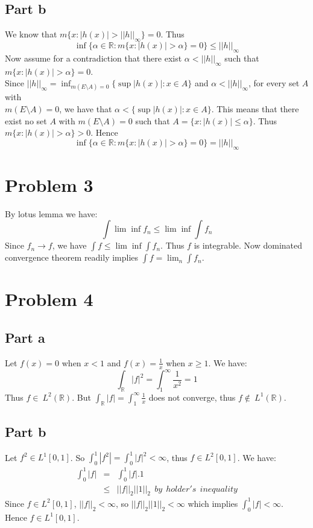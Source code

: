 \documentclass[12pt]{article}
\begin{document}
\subsection*{Part b}
We know that $m\{x : |h(x)| > ||h||_{\infty}\}=0$. Thus
$$\inf \{\alpha \in \mathbb{R}: m\{x:|h(x)| >\alpha \} =0\} \le ||h||_{\infty}$$
Now assume for a contradiction that there exist $\alpha < ||h||_{\infty}$ such that
$m\{x : |h(x)| > \alpha \} = 0$.\\
Since $||h||_{\infty}=\inf_{m(E\setminus A)=0}
\{\sup |h(x)|:x \in A\}$ and $\alpha < ||h||_{\infty}$, for every set $A$ with \\ 
$m(E\setminus A)=0$, we have that $\alpha < \{\sup |h(x)|: x \in A\}$.
This means that there exist no set $A$ with $m(E\setminus A)=0$ such that
$A=\{x: |h(x)| \le \alpha \}$. Thus $m\{x: |h(x)| > \alpha \} > 0$. Hence 
$$\inf \{\alpha \in \mathbb{R}: m\{x:|h(x)| >\alpha \} =0\} = ||h||_{\infty}$$


\section*{Problem 3}
By lotus lemma we have:
$$\int \lim \inf  f_n \le \lim \inf \int f_n$$
Since $f_n \rightarrow f$, we have 
$\int f \le \lim \inf \int f_n$. Thus $f$ is integrable. Now dominated convergence theorem readily implies $\int f = \lim_n \int f_n$.


\clearpage
\section*{Problem 4}
\subsection*{Part a}
Let $f(x)=0$ when $x<1$ and $f(x)=\frac{1}{x}$ when $x \ge 1$. We have:
$$\int_{\mathbb{R}} |f|^2 =\int_1^{\infty} \frac{1}{x^2} = 1$$
Thus $f \in  \ L^2(\mathbb{R})$. But
$\int_{\mathbb{R}} |f| =\int_1^{\infty} \frac{1}{x} $ does not converge, thus $f \not\in \ L^1(\mathbb{R})$. \\


\subsection*{Part b}
Let $f^2 \in L^1[0,1]$. So
$\int_0^1 |f^2| =\int_0^1 |f|^2 < \infty$, thus
$f \in L^2[0,1]$. We have:
\begin{eqnarray*}
\int_0^1 |f| &=& \int_0^1 |f|.1
\\ & \le &
||f||_2||1||_2 \ \ by \ \ holder's \ \ inequality
\end{eqnarray*} 
Since $f \in L^2[0,1]$, $||f||_2 < \infty$, so
$||f||_2||1||_2 < \infty$ which implies $\int_0^1 |f| < \infty$. \\
Hence $f \in L^1[0,1]$.
\end{document}
